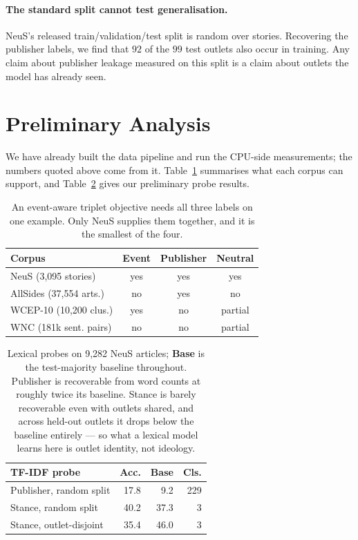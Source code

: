 \documentclass[10pt,twocolumn,a4paper]{article}
\begin{document}
\paragraph{The standard split cannot test generalisation.}
NeuS's released train/validation/test split is random over stories. Recovering
the publisher labels, we find that $92$ of the $99$ test outlets also occur in
training. Any claim about publisher leakage measured on this split is a claim
about outlets the model has already seen.

\section{Preliminary Analysis}

We have already built the data pipeline and run the CPU-side measurements; the
numbers quoted above come from it. Table~\ref{tab:corpora} summarises what each
corpus can support, and Table~\ref{tab:probe} gives our preliminary probe
results.

\begin{table}[t]
\centering\small
\setlength{\tabcolsep}{3.5pt}
\begin{tabular}{@{}lccc@{}}
\toprule
\textbf{Corpus} & \textbf{Event} & \textbf{Publisher} & \textbf{Neutral} \\
\midrule
NeuS (3{,}095 stories)     & yes & yes & yes \\
AllSides (37{,}554 arts.)  & no  & yes & no  \\
WCEP-10 (10{,}200 clus.)   & yes & no  & partial \\
WNC (181k sent. pairs)     & no  & no  & partial \\
\bottomrule
\end{tabular}
\caption{An event-aware triplet objective needs all three labels on one example.
Only NeuS supplies them together, and it is the smallest of the four.}
\label{tab:corpora}
\end{table}

\begin{table}[t]
\centering\small
\setlength{\tabcolsep}{3.5pt}
\begin{tabular}{@{}lrrr@{}}
\toprule
\textbf{TF-IDF probe} & \textbf{Acc.} & \textbf{Base} & \textbf{Cls.} \\
\midrule
Publisher, random split  & 17.8 & 9.2  & 229 \\
Stance, random split     & 40.2 & 37.3 & 3 \\
Stance, outlet-disjoint  & 35.4 & 46.0 & 3 \\
\bottomrule
\end{tabular}
\caption{Lexical probes on 9{,}282 NeuS articles; \textbf{Base} is the
test-majority baseline throughout. Publisher is recoverable from word counts at
roughly twice its baseline. Stance is barely recoverable even with outlets
shared, and across held-out outlets it drops below the baseline entirely --- so
what a lexical model learns here is outlet identity, not ideology.}
\label{tab:probe}
\end{table}
\end{document}
